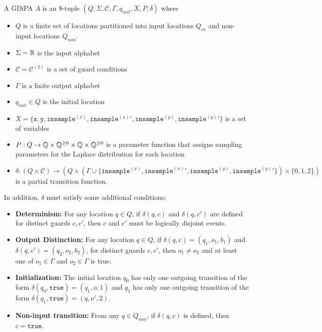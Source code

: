 \begin{defn}
    A GDiPA $A$ is an 8-tuple $(Q, \Sigma, \mathcal{C}, \Gamma, q_{init}, X, P, \delta)$ where
    \begin{itemize}
        \item $Q$ is a finite set of locations partitioned into input locations $Q_{in}$ and non-input locations $Q_{non}$. 
        \item $\Sigma = \mathbb{R}$ is the input alphabet
        \item $\mathcal{C} = \mathcal{C}^{(2)}$ is a set of guard conditions
        \item $\Gamma$ is a finite output alphabet
        \item $q_{init}\in Q$ is the initial location
        \item $X = \{\texttt{x}, \texttt{y}, \texttt{insample}^{(x)}, \texttt{insample}^{(x)}\prime, \texttt{insample}^{(y)}, \texttt{insample}^{(y)}\prime\}$ is a set of variables
        \item $P: Q\to \mathbb{Q}\times \mathbb{Q}^{\geq 0}\times \mathbb{Q}\times  \mathbb{Q}^{\geq 0}$ is a parameter function that assigns sampling parameters for the Laplace distribution for each location
        \item $\delta:(Q\times \mathcal{C})\to (Q\times (\Gamma \cup \{\texttt{insample}^{(x)}, \texttt{insample}^{(x)}\prime, \texttt{insample}^{(y)}, \texttt{insample}^{(y)}\prime\})\times \{0, 1, 2\})$ is a partial transition function. 
    \end{itemize}
    In addition, $\delta$ must satisfy some additional conditions:
    \begin{itemize}
        \item \textbf{Determinism:} For any location $q\in Q$, if $\delta(q, c)$ and $\delta(q, c')$ are defined for distinct guards $c, c'$,  then $c$ and $c'$ must be logically disjoint events.

        \item \textbf{Output Distinction:} For any location $q\in Q$, if $\delta(q, c) = (q_1, o_1, b_1)$ and $\delta(q, c') = (q_2, o_2, b_2)$, for distinct guards $c, c'$, then $o_1\neq o_2$ and at least one of $o_1\in \Gamma$ and $o_2\in \Gamma$ is true.

        \item \textbf{Initialization:} The initial location $q_0$ has only one outgoing transition of the form $\delta(q_0, \texttt{true}) = (q_1, o, 1)$ and $q_1$ has only one outgoing transition of the form $\delta(q_1, \texttt{true}) = (q, o', 2)$.

        \item \textbf{Non-input transition:} From any $q\in Q_{non}$, if $\delta(q, c)$ is defined, then $c=\texttt{true}$.
    \end{itemize}
\end{defn}

